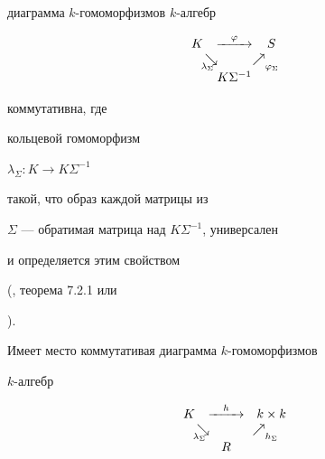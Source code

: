 диаграмма $k$-гомоморфизмов $k$-алгебр


\begin{eqnarray*}


\begin{array}{ccc}


K & \stackrel{\varphi}{\hbox to 1cm{\rightarrowfill}} & S \\


\phantom{\searrow}\makebox[0pt][l]{\kern1pt{${\searrow}$}}%


\makebox[0pt][l]{\kern-2pt{\lower5pt\hbox{\scriptsize $\lambda_\Sigma$}}} &


&\phantom{\nearrow}\makebox[0pt][l]{\kern-20pt{${\nearrow}$}}%




\makebox[0pt][l]{\kern-10pt{\lower5pt\hbox{\scriptsize $\varphi_\Sigma$}}}\\


& K \Sigma^{-1} &


\end{array}


\end{eqnarray*}


коммутативна, где


кольцевой гомоморфизм


$\lambda_\Sigma: K \to K\Sigma^{-1}$


такой, что образ каждой матрицы из 


$\Sigma$ --- обратимая матрица над $K\Sigma^{-1}$, универсален 


и определяется этим свойством


(\cite{cohn}, теорема 7.2.1 или


\cite{gerasimov}).





Имеет место коммутативая диаграмма $k$-гомоморфизмов 


$k$-алгебр


\begin{eqnarray*}


\begin{array}{ccc}


K & \stackrel{h}{\hbox to 1cm{\rightarrowfill}} & k\times k \\


\phantom{\searrow}\makebox[0pt][l]{\kern1pt{${\searrow}$}}%


\makebox[0pt][l]{\kern-2pt{\lower5pt\hbox{\scriptsize$\lambda_\Sigma$}}} &


&\phantom{\nearrow}\makebox[0pt][l]{\kern-20pt{${\nearrow}$}}%


\makebox[0pt][l]{\kern-10pt{\lower5pt\hbox{\scriptsize$h_\Sigma$}}}\\


& R &


\end{array}


\end{eqnarray*}


